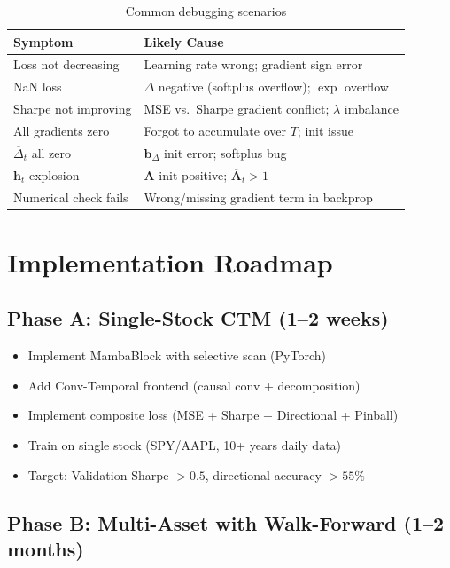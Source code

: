\documentclass[11pt,a4paper]{article}
\begin{document}
\begin{table}[h]
\centering
\caption{Common debugging scenarios}
\label{tab:bugs}
\begin{tabular}{lp{8cm}}
\toprule
Symptom & Likely Cause \\
\midrule
Loss not decreasing & Learning rate wrong; gradient sign error \\
NaN loss & $\Delta$ negative (softplus overflow); $\exp$ overflow \\
Sharpe not improving & MSE vs.\ Sharpe gradient conflict; $\lambda$ imbalance \\
All gradients zero & Forgot to accumulate over $T$; init issue \\
$\overline{\Delta}_t$ all zero & $\mathbf{b}_\Delta$ init error; softplus bug \\
$\mathbf{h}_t$ explosion & $\mathbf{A}$ init positive; $\overline{\mathbf{A}}_t > 1$ \\
Numerical check fails & Wrong/missing gradient term in backprop \\
\bottomrule
\end{tabular}
\end{table}

\section{Implementation Roadmap}

\subsection{Phase A: Single-Stock CTM (1--2 weeks)}

\begin{itemize}
  \item Implement MambaBlock with selective scan (PyTorch)
  \item Add Conv-Temporal frontend (causal conv + decomposition)
  \item Implement composite loss (MSE + Sharpe + Directional + Pinball)
  \item Train on single stock (SPY/AAPL, 10+ years daily data)
  \item Target: Validation Sharpe $>0.5$, directional accuracy $>55\%$
\end{itemize}

\subsection{Phase B: Multi-Asset with Walk-Forward (1--2 months)}
\end{document}
